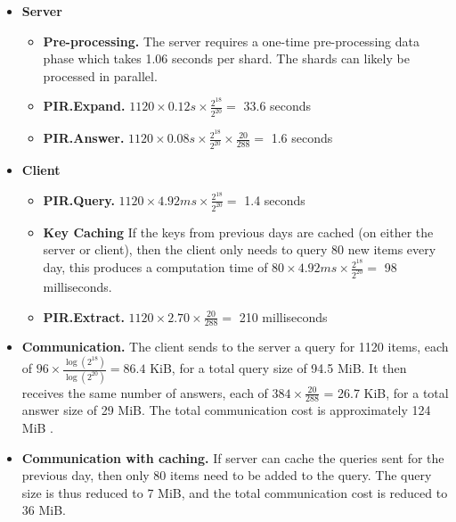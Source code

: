 \documentclass[11pt]{article} %
\newcommand{\pirqe}{\textsf{PIR.Query}}
\newcommand{\pirexpand}{\textsf{PIR.Expand}}
\newcommand{\pirans}{\textsf{PIR.Answer}}
\newcommand{\pirextract}{\textsf{PIR.Extract}}
\begin{document}
{	\begin{itemize}
		\item \textbf{Server}
		\begin{itemize}
			\item \textbf{Pre-processing.} The server requires a one-time pre-processing data phase which takes 1.06 seconds per shard. The shards can likely be processed in parallel.
			
			
			\item \textbf{\pirexpand.} $1120 \times 0.12 s \times \frac{2^{18}}{2^{20}} =$ 33.6 seconds
			
			\item \textbf{\pirans.} $1120 \times 0.08 s \times \frac{2^{18}}{2^{20}} \times \frac{20}{288} =$ 1.6 seconds
		\end{itemize}
		\item \textbf{Client}
		\begin{itemize}
			\item \textbf{\pirqe.} $1120 \times 4.92 ms \times \frac{2^{18}}{2^{20}} =$ 1.4 seconds
			
			
			\item \textbf{Key Caching} If the keys from previous days are cached (on either the server or client), then the client only needs to query 80 new items every day, this produces a computation time of $80 \times 4.92 ms \times \frac{2^{18}}{2^{20}} =$ 98 milliseconds.
			
			
			\item \textbf{\pirextract.} $1120 \times 2.70 \times \frac{20}{288} = $ 210 milliseconds
		\end{itemize}
		
		\item \textbf{Communication.} The client sends to the server a query for 1120 items, each of $96 \times \frac{\log(2^{18})}{\log(2^{20})}=86.4$ KiB, for a total query size of 94.5 MiB. It then receives the same number of answers, each of $384 \times \frac{20}{288}$ = 26.7 KiB, for a total answer size of 29 MiB. The total communication cost is approximately 124 MiB
		.
		\item \textbf{Communication with caching.} If server can cache the queries sent for the previous day, then only 80 items need to be added to the query. The query size is thus reduced to 7 MiB, and the total communication cost is reduced to 36 MiB.
		
	\end{itemize}
	
}
\end{document}
